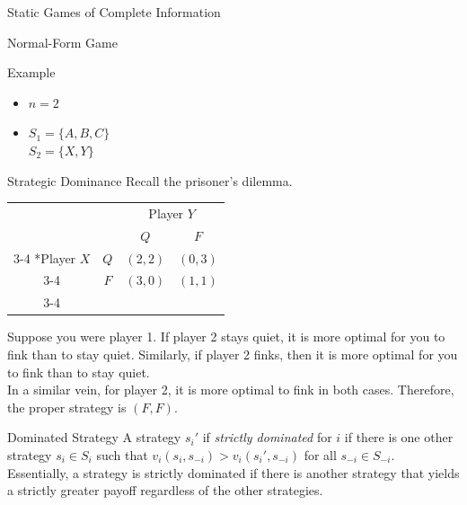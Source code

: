 \documentclass[8pt]{extarticle}
\begin{document}
\begin{problem}{Static Games of Complete Information}
\begin{problem}{Normal-Form Game}
\begin{problem}{Example}
\begin{itemize}
          \item $n = 2$
          \item $S_1 = \{A,B,C\}$\\
            $S_2 = \{X,Y\}$
        \end{itemize}
      \end{problem}
    \end{problem}
    \begin{problem}{Strategic Dominance}
      Recall the prisoner's dilemma.
      \begin{center}
        \renewcommand{\arraystretch}{1.25}
        \begin{tabular}{cc|c|c|}
          & \multicolumn{1}{c}{} & \multicolumn{2}{c}{Player $Y$}\\
          & \multicolumn{1}{c}{} & \multicolumn{1}{c}{$Q$}  & \multicolumn{1}{c}{$F$} \\\cline{3-4}
          \multirow{2}*{Player $X$}  & $Q$ & $(2,2)$ & $(0,3)$ \\\cline{3-4}
          & $F$ & $(3,0)$ & $(1,1)$ \\\cline{3-4}
        \end{tabular}
      \end{center}
      Suppose you were player 1. If player 2 stays quiet, it is more optimal for you to fink than to stay quiet. Similarly, if player 2 finks, then it is more optimal for you to fink than to stay quiet.\\

      In a similar vein, for player 2, it is more optimal to fink in both cases. Therefore, the proper strategy is $(F,F)$.\\

      \begin{problem}{Dominated Strategy}
        A strategy $s_i'$ if \textit{strictly dominated} for $i$ if there is one other strategy $s_i\in S_i$ such that $v_i(s_i,s_{-i}) > v_i(s_i',s_{-i})$ for all $s_{-i} \in S_{-i}$.\\

        Essentially, a strategy is strictly dominated if there is another strategy that yields a strictly greater payoff regardless of the other strategies.\\


\end{problem}
\end{problem}
\end{problem}
\end{document}
